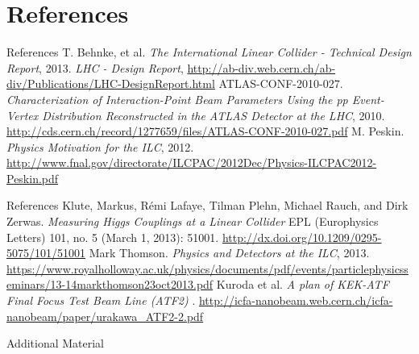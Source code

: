 \documentclass[xcolor={dvipsnames}]{beamer}
\begin{document}
\section*{References}
\begin{thebibliography}{9}
\begin{frame}{References}
 T. Behnke, et al.
\emph{The International Linear Collider - Technical Design Report}, 2013.
 \emph{LHC - Design Report}, \url{http://ab-div.web.cern.ch/ab-div/Publications/LHC-DesignReport.html}
 ATLAS-CONF-2010-027. \emph{Characterization of Interaction-Point Beam Parameters Using the pp Event-Vertex Distribution Reconstructed in the ATLAS Detector at the LHC}, 2010. \url{http://cds.cern.ch/record/1277659/files/ATLAS-CONF-2010-027.pdf}
 M. Peskin. \emph{Physics Motivation for the ILC}, 2012. \url{http://www.fnal.gov/directorate/ILCPAC/2012Dec/Physics-ILCPAC2012-Peskin.pdf}
\end{frame}
\begin{frame}{References}
 Klute, Markus, Rémi Lafaye, Tilman Plehn, Michael Rauch, and
Dirk Zerwas. \emph{Measuring Higgs Couplings at a Linear Collider}
EPL (Europhysics Letters) 101, no. 5 (March 1, 2013): 51001. \url{http://dx.doi.org/10.1209/0295-5075/101/51001}
 Mark Thomson. \emph{Physics and Detectors at the ILC}, 2013. \url{https://www.royalholloway.ac.uk/physics/documents/pdf/events/particlephysicsseminars/13-14markthomson23oct2013.pdf}
 Kuroda et al. \emph{A plan of KEK-ATF Final Focus Test Beam Line (ATF2)
}. \url{http://icfa-nanobeam.web.cern.ch/icfa-nanobeam/paper/urakawa_ATF2-2.pdf}

\end{frame}
\end{thebibliography}

\appendix

\begin{frame}
\begin{center}
\LARGE Additional Material
\end{center}
  \tableofcontents
\end{frame}
\end{document}
